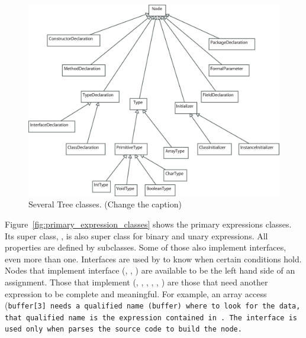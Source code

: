 \begin{figure}[!htb]
\begin{center}
\includegraphics[width=\textwidth]{images/several.eps}
\caption{Several Tree classes. (Change the caption)}
\label{fig:several_tree_classes}
\end{center}
\end{figure}

Figure~\ref{fig:primary_expression_classes} shows the primary
expressions classes. Its super class, , is also super
class for binary and unary expressions. All properties are defined
by  subclasses. Some of those also implement
interfaces, even more than one. Interfaces are used by \djava{} to
know when certain conditions hold. Nodes that implement
 interface (, ,
) are available to be the left hand side of an
assignment. Those that implement 
(, ,
, ,
, ) are those that need another
expression to be complete and meaningful. For example, an array
access (\tt{buffer[3]} needs a qualified name (\tt{buffer}) where to look for the data, that
qualified name is the expression contained in . The interface
 is used only when \djava{} parses the
source code to build the  node.

